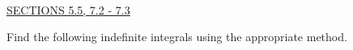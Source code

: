 \documentclass{exam}
\begin{document}
\begin{questions}
\ \\
\underline{SECTIONS 5.5, 7.2 - 7.3 }
\thispagestyle{empty}

\question Find the following indefinite integrals using the appropriate method.  
\begin{parts}
\end{parts}
\end{questions}
\end{document}
